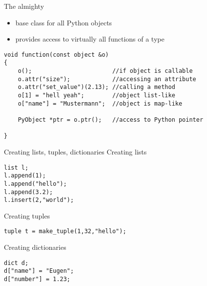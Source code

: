 \begin{frame}[fragile]{The almighty \pyobject}
    \begin{itemize}
        \setlength{\itemsep}{0.05\textheight}
        \item base class for all Python objects
        \item provides access to virtually all functions of a type
    \end{itemize}
    \vspace{0.1\textheight}
    \begin{verbatim}
void function(const object &o)
{
    o();                       //if object is callable
    o.attr("size");            //accessing an attribute
    o.attr("set_value")(2.13); //calling a method
    o[1] = "hell yeah";        //object list-like
    o["name"] = "Mustermann";  //object is map-like

    PyObject *ptr = o.ptr();   //access to Python pointer

}
    \end{verbatim}
\end{frame}
\begin{frame}[fragile]{Creating lists, tuples, dictionaries}
    Creating lists
    \begin{verbatim}
list l;
l.append(1);
l.append("hello");
l.append(3.2);
l.insert(2,"world");
    \end{verbatim}
    
    \vspace{0.05\textheight}
    Creating tuples
    \begin{verbatim}
tuple t = make_tuple(1,32,"hello");
    \end{verbatim}
    
    \vspace{0.05\textheight}
    Creating dictionaries
    \begin{verbatim}
dict d;
d["name"] = "Eugen";
d["number"] = 1.23;
    \end{verbatim}
\end{frame}

